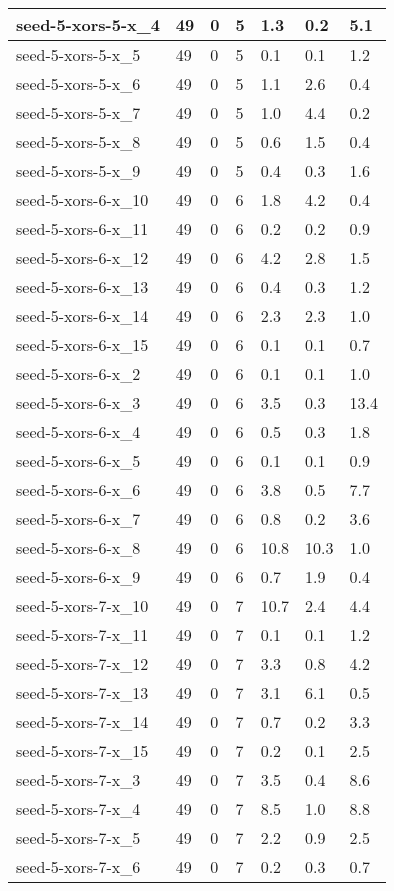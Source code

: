 \begin{scriptsize}
\begin{longtable}{|p{5cm}|l|l|l|l|l|l|}
seed-5-xors-5-x\_4&49&0&5&1.3&0.2&5.1 \\ \hline 
seed-5-xors-5-x\_5&49&0&5&0.1&0.1&1.2 \\ \hline 
seed-5-xors-5-x\_6&49&0&5&1.1&2.6&0.4 \\ \hline 
seed-5-xors-5-x\_7&49&0&5&1.0&4.4&0.2 \\ \hline 
seed-5-xors-5-x\_8&49&0&5&0.6&1.5&0.4 \\ \hline 
seed-5-xors-5-x\_9&49&0&5&0.4&0.3&1.6 \\ \hline 
seed-5-xors-6-x\_10&49&0&6&1.8&4.2&0.4 \\ \hline 
seed-5-xors-6-x\_11&49&0&6&0.2&0.2&0.9 \\ \hline 
seed-5-xors-6-x\_12&49&0&6&4.2&2.8&1.5 \\ \hline 
seed-5-xors-6-x\_13&49&0&6&0.4&0.3&1.2 \\ \hline 
seed-5-xors-6-x\_14&49&0&6&2.3&2.3&1.0 \\ \hline 
seed-5-xors-6-x\_15&49&0&6&0.1&0.1&0.7 \\ \hline 
seed-5-xors-6-x\_2&49&0&6&0.1&0.1&1.0 \\ \hline 
seed-5-xors-6-x\_3&49&0&6&3.5&0.3&13.4 \\ \hline 
seed-5-xors-6-x\_4&49&0&6&0.5&0.3&1.8 \\ \hline 
seed-5-xors-6-x\_5&49&0&6&0.1&0.1&0.9 \\ \hline 
seed-5-xors-6-x\_6&49&0&6&3.8&0.5&7.7 \\ \hline 
seed-5-xors-6-x\_7&49&0&6&0.8&0.2&3.6 \\ \hline 
seed-5-xors-6-x\_8&49&0&6&10.8&10.3&1.0 \\ \hline 
seed-5-xors-6-x\_9&49&0&6&0.7&1.9&0.4 \\ \hline 
seed-5-xors-7-x\_10&49&0&7&10.7&2.4&4.4 \\ \hline 
seed-5-xors-7-x\_11&49&0&7&0.1&0.1&1.2 \\ \hline 
seed-5-xors-7-x\_12&49&0&7&3.3&0.8&4.2 \\ \hline 
seed-5-xors-7-x\_13&49&0&7&3.1&6.1&0.5 \\ \hline 
seed-5-xors-7-x\_14&49&0&7&0.7&0.2&3.3 \\ \hline 
seed-5-xors-7-x\_15&49&0&7&0.2&0.1&2.5 \\ \hline 
seed-5-xors-7-x\_3&49&0&7&3.5&0.4&8.6 \\ \hline 
seed-5-xors-7-x\_4&49&0&7&8.5&1.0&8.8 \\ \hline 
seed-5-xors-7-x\_5&49&0&7&2.2&0.9&2.5 \\ \hline 
seed-5-xors-7-x\_6&49&0&7&0.2&0.3&0.7 \\ \hline 

\end{longtable}
\end{scriptsize}
